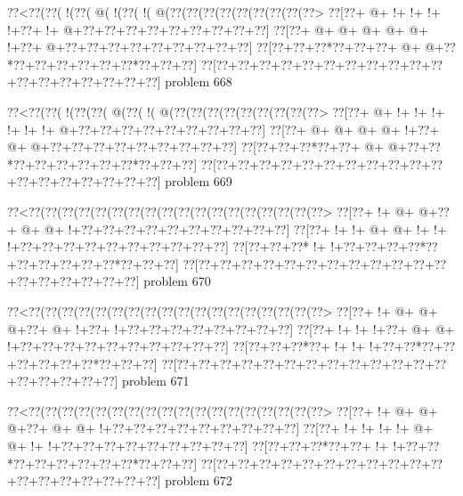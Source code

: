 \vbox{\vbox{\goo
\0??<\0??(\0??(\- !(\0??(\- @(\- !(\0??(\- !(\- @(\0??(\0??(\0??(\0??(\0??(\0??(\0??(\0??(\0??>
\0??[\0??+\- @+\- !+\- !+\- !+\- !+\0??+\- !+\- @+\0??+\0??+\0??+\0??+\0??+\0??+\0??+\0??+\0??]
\0??[\0??+\- @+\- @+\- @+\- @+\- @+\- !+\0??+\- @+\0??+\0??+\0??+\0??+\0??+\0??+\0??+\0??+\0??]
\0??[\0??+\0??+\0??*\0??+\0??+\0??+\- @+\- @+\0??*\0??+\0??+\0??+\0??+\0??+\0??*\0??+\0??+\0??]
\0??[\0??+\0??+\0??+\0??+\0??+\0??+\0??+\0??+\0??+\0??+\0??+\0??+\0??+\0??+\0??+\0??+\0??+\0??]
}
\hfil problem 668\hfil\break
}



\vbox{\vbox{\goo
\0??<\0??(\0??(\- !(\0??(\0??(\- @(\0??(\- !(\- @(\0??(\0??(\0??(\0??(\0??(\0??(\0??(\0??(\0??>
\0??[\0??+\- @+\- !+\- !+\- !+\- !+\- !+\- !+\- @+\0??+\0??+\0??+\0??+\0??+\0??+\0??+\0??+\0??]
\0??[\0??+\- @+\- @+\- @+\- @+\- !+\0??+\- @+\- @+\0??+\0??+\0??+\0??+\0??+\0??+\0??+\0??+\0??]
\0??[\0??+\0??+\0??*\0??+\0??+\- @+\- @+\0??+\0??*\0??+\0??+\0??+\0??+\0??+\0??*\0??+\0??+\0??]
\0??[\0??+\0??+\0??+\0??+\0??+\0??+\0??+\0??+\0??+\0??+\0??+\0??+\0??+\0??+\0??+\0??+\0??+\0??]
}
\hfil problem 669\hfil\break
}



\vbox{\vbox{\goo
\0??<\0??(\0??(\0??(\0??(\0??(\0??(\0??(\0??(\0??(\0??(\0??(\0??(\0??(\0??(\0??(\0??(\0??(\0??>
\0??[\0??+\- !+\- @+\- @+\0??+\- @+\- @+\- !+\0??+\0??+\0??+\0??+\0??+\0??+\0??+\0??+\0??+\0??]
\0??[\0??+\- !+\- !+\- @+\- @+\- !+\- !+\- !+\0??+\0??+\0??+\0??+\0??+\0??+\0??+\0??+\0??+\0??]
\0??[\0??+\0??+\0??*\- !+\- !+\0??+\0??+\0??+\0??*\0??+\0??+\0??+\0??+\0??+\0??*\0??+\0??+\0??]
\0??[\0??+\0??+\0??+\0??+\0??+\0??+\0??+\0??+\0??+\0??+\0??+\0??+\0??+\0??+\0??+\0??+\0??+\0??]
}
\hfil problem 670\hfil\break
}



\vbox{\vbox{\goo
\0??<\0??(\0??(\0??(\0??(\0??(\0??(\0??(\0??(\0??(\0??(\0??(\0??(\0??(\0??(\0??(\0??(\0??(\0??>
\0??[\0??+\- !+\- @+\- @+\- @+\0??+\- @+\- !+\0??+\- !+\0??+\0??+\0??+\0??+\0??+\0??+\0??+\0??]
\0??[\0??+\- !+\- !+\- !+\0??+\- @+\- @+\- !+\0??+\0??+\0??+\0??+\0??+\0??+\0??+\0??+\0??+\0??]
\0??[\0??+\0??+\0??*\0??+\- !+\- !+\- !+\0??+\0??*\0??+\0??+\0??+\0??+\0??+\0??*\0??+\0??+\0??]
\0??[\0??+\0??+\0??+\0??+\0??+\0??+\0??+\0??+\0??+\0??+\0??+\0??+\0??+\0??+\0??+\0??+\0??+\0??]
}
\hfil problem 671\hfil\break
}



\vbox{\vbox{\goo
\0??<\0??(\0??(\0??(\0??(\0??(\0??(\0??(\0??(\0??(\0??(\0??(\0??(\0??(\0??(\0??(\0??(\0??(\0??>
\0??[\0??+\- !+\- @+\- @+\- @+\0??+\- @+\- @+\- !+\0??+\0??+\0??+\0??+\0??+\0??+\0??+\0??+\0??]
\0??[\0??+\- !+\- !+\- !+\- !+\- @+\- @+\- !+\- !+\0??+\0??+\0??+\0??+\0??+\0??+\0??+\0??+\0??]
\0??[\0??+\0??+\0??*\0??+\0??+\- !+\- !+\0??+\0??*\0??+\0??+\0??+\0??+\0??+\0??*\0??+\0??+\0??]
\0??[\0??+\0??+\0??+\0??+\0??+\0??+\0??+\0??+\0??+\0??+\0??+\0??+\0??+\0??+\0??+\0??+\0??+\0??]
}
\hfil problem 672\hfil\break
}



